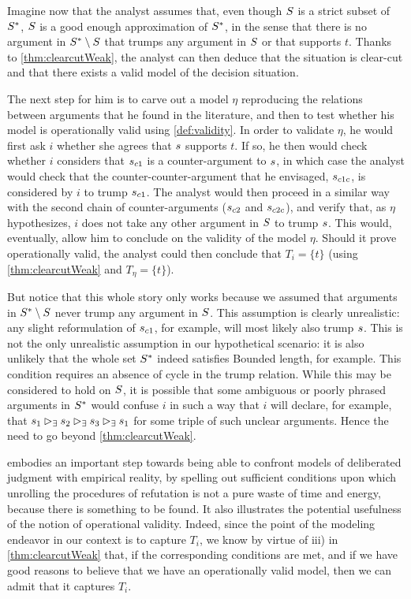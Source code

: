 \documentclass[smallextended,nospthms, natbib]{svjour3}
\begin{document}
\begin{example}
Imagine now that the analyst assumes that, even though $S$ is a strict subset of $S^*$, $S$ is a good enough approximation of $S^*$, in the sense that there is no argument in $S^* \setminus S$ that trumps any argument in $S$ or that supports $t$.
Thanks to \cref{thm:clearcutWeak}, the analyst can then deduce that the situation is clear-cut and that there exists a valid model of the decision situation.

The next step for him is to carve out a model $\eta$ reproducing the relations between arguments that he found in the literature, and then to test whether his model is operationally valid using \cref{def:validity}. 
In order to validate $\eta$, he would first ask $i$ whether she agrees that $s$ supports $t$. If so, he then would check whether $i$ considers that $s_{c1}$ is a counter-argument to $s$, in which case the analyst would check that the counter-counter-argument that he envisaged, $s_{c1c}$, is considered by $i$ to trump $s_{c1}$. The analyst would then proceed in a similar way with the second chain of counter-arguments ($s_{c2}$ and $s_{c2c}$), and verify that, as $\eta$ hypothesizes, $i$ does not take any other argument in $S$ to trump $s$. This would, eventually, allow him to conclude on the validity of the model $\eta$.
Should it prove operationally valid, the analyst could then conclude that $T_i=\{t\}$ (using \cref{thm:clearcutWeak} and $T_\eta=\{t\}$). 

But notice that this whole story only works because we assumed that arguments in $S^* \setminus S$ never trump any argument in $S$. This assumption is clearly unrealistic: any slight reformulation of $s_{c1}$, for example, will most likely also trump $s$. This is not the only unrealistic assumption in our hypothetical scenario: it is also unlikely that the whole set $S^*$ indeed satisfies Bounded length, for example. This condition requires an absence of cycle in the trump relation. While this may be considered to hold on $S$, it is possible that some ambiguous or poorly phrased arguments in $S^*$ would confuse $i$ in such a way that $i$ will declare, for example, that $s_1 \mathbin{\vartriangleright_\exists} s_2 \mathbin{\vartriangleright_\exists} s_3 \mathbin{\vartriangleright_\exists} s_1$ for some triple of such unclear arguments. Hence the need to go beyond \cref{thm:clearcutWeak}.
\end{example}

 embodies an important step towards being able to confront models of deliberated judgment with empirical reality, by spelling out sufficient conditions upon which unrolling the procedures of refutation is not a pure waste of time and energy, because there is something to be found. It also illustrates the potential usefulness of the notion of operational validity. Indeed, since the point of the modeling endeavor in our context is to capture $T_i$, we know by virtue of iii) in \cref{thm:clearcutWeak} that, if the corresponding conditions are met, and if we have good reasons to believe that we have an operationally valid model, then we can admit that it captures $T_i$.
\end{document}
